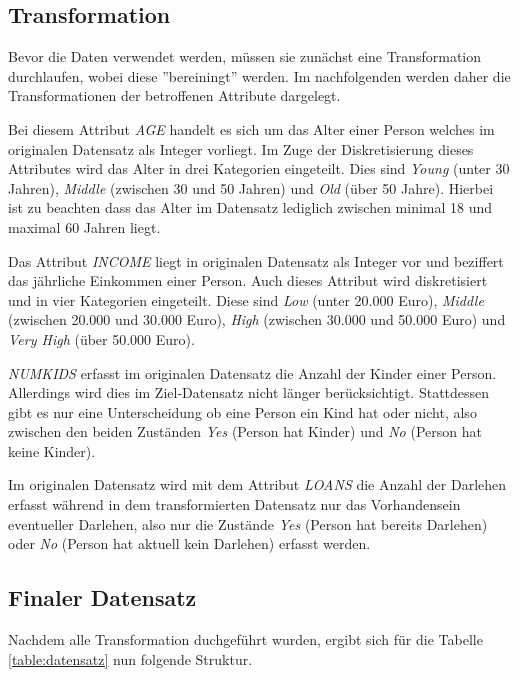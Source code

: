 \subsection{Transformation}
\label{id3:datensatz-trans}

Bevor die Daten verwendet werden, müssen sie zunächst eine Transformation durchlaufen, wobei diese ''bereiningt'' werden. Im nachfolgenden werden daher die Transformationen der betroffenen Attribute dargelegt.

Bei diesem Attribut \textit{AGE} handelt es sich um das Alter einer Person welches im originalen Datensatz als Integer vorliegt. Im Zuge der Diskretisierung dieses Attributes wird das Alter in drei Kategorien eingeteilt. Dies sind \textit{Young} (unter 30 Jahren), \textit{Middle} (zwischen 30 und 50 Jahren) und \textit{Old} (über 50 Jahre). Hierbei ist zu beachten dass das Alter im Datensatz lediglich zwischen minimal 18 und maximal 60 Jahren liegt.

Das Attribut \textit{INCOME} liegt in originalen Datensatz als Integer vor und beziffert das jährliche Einkommen einer Person. Auch dieses Attribut wird diskretisiert und in vier Kategorien eingeteilt. Diese sind \textit{Low} (unter 20.000 Euro), \textit{Middle} (zwischen 20.000 und 30.000 Euro), \textit{High} (zwischen 30.000 und 50.000 Euro) und \textit{Very High} (über 50.000 Euro).

\textit{NUMKIDS} erfasst im originalen Datensatz die Anzahl der Kinder einer Person. Allerdings wird dies im Ziel-Datensatz nicht länger berücksichtigt. Stattdessen gibt es nur eine Unterscheidung ob eine Person ein Kind hat oder nicht, also zwischen den beiden Zuständen \textit{Yes} (Person hat Kinder) und \textit{No} (Person hat keine Kinder).

Im originalen Datensatz wird mit dem Attribut \textit{LOANS} die Anzahl der Darlehen erfasst während in dem transformierten Datensatz nur das Vorhandensein eventueller Darlehen, also nur die Zustände \textit{Yes} (Person hat bereits Darlehen) oder \textit{No} (Person hat aktuell kein Darlehen) erfasst werden.

\pagebreak

\subsection{Finaler Datensatz}
\label{id3:datensatz-final}

Nachdem alle Transformation duchgeführt wurden, ergibt sich für die Tabelle \ref{table:datensatz} nun folgende Struktur.

